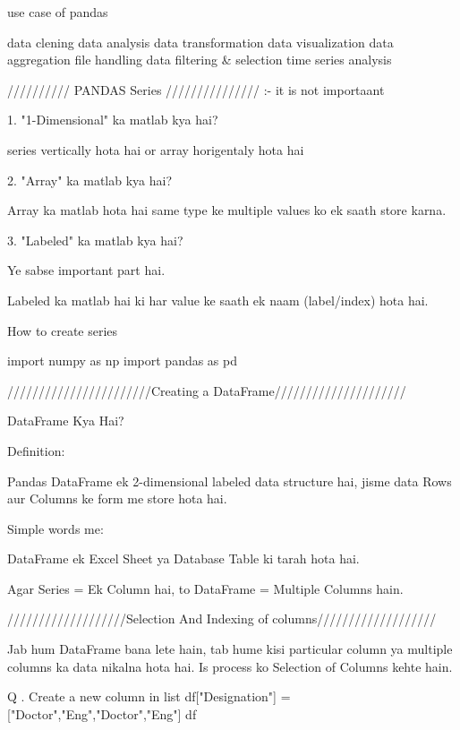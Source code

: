 use case of pandas 

data clening 
data analysis 
data transformation
data visualization
data aggregation
file handling 
data filtering & selection 
time series analysis 



////////// PANDAS Series ///////////////    :- it is not importaant

1. "1-Dimensional" ka matlab kya hai?

series vertically hota hai or array horigentaly hota hai 


2. "Array" ka matlab kya hai?

Array ka matlab hota hai same type ke multiple values ko ek saath store karna.


3. "Labeled" ka matlab kya hai?

Ye sabse important part hai.

Labeled ka matlab hai ki har value ke saath ek naam (label/index) hota hai.




How to create series 


import numpy as np
import pandas as pd




///////////////////////Creating a DataFrame///////////////////// 

DataFrame Kya Hai?

Definition:

Pandas DataFrame ek 2-dimensional labeled data structure hai, jisme data Rows aur Columns ke form me store hota hai.

Simple words me:

DataFrame ek Excel Sheet ya Database Table ki tarah hota hai.

Agar Series = Ek Column hai, to DataFrame = Multiple Columns hain.



///////////////////Selection And Indexing of columns///////////////////

Jab hum DataFrame bana lete hain, tab hume kisi particular column ya multiple columns ka data nikalna hota hai. Is process ko Selection of Columns kehte hain.

Q . Create a new column in list 
df["Designation"] = ["Doctor","Eng","Doctor","Eng"] 
df


